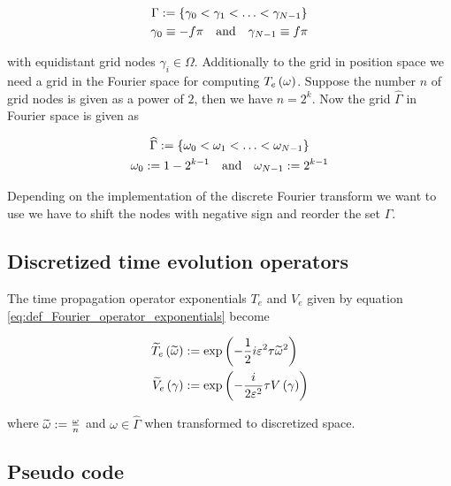 \begin{gather} \label{eq:comp_domain_grid}
  \Gamma := \{ \gamma_0 < \gamma_1 < \ldots < \gamma_{N-1} \} \\
  \gamma_0 \equiv -f \pi \quad \text{and} \quad \gamma_{N-1} \equiv f \pi
\end{gather}

with equidistant grid nodes $\gamma_i \in \Omega$. Additionally to the grid in position space
we need a grid in the Fourier space for computing $T_e\left( \omega \right)$. Suppose the
number $n$ of grid nodes is given as a power of $2$, then we have $n = 2^{k}$. Now
the grid $\widehat{\Gamma}$ in Fourier space is given as

\begin{gather} \label{eq:comp_domain_grid_fourier}
  \widehat{\Gamma} := \{ \omega_0 < \omega_1 < \ldots < \omega_{N-1} \} \\
  \omega_0 := 1-2^{k-1} \quad \text{and} \quad \omega_{N-1} := 2^{k-1}
\end{gather}

Depending on the implementation of the discrete Fourier transform we want to use
we have to shift the nodes with negative sign and reorder the set $\widehat{\Gamma}$.

\subsection{Discretized time evolution operators}

The time propagation operator exponentials $T_e$ and $V_e$ given by equation \eqref{eq:def_Fourier_operator_exponentials}
become

\begin{equation}
\begin{split}
  \widetilde{T}_e\left( \widetilde{\omega} \right) & := \exp\left( -\frac{1}{2}i\varepsilon^2\tau\widetilde{\omega}^2 \right) \\
  \widetilde{V}_e\left( \gamma \right)             & := \exp\left( -\frac{i}{2\varepsilon^2}\tau V\left( \gamma \right) \right)
\end{split}
\end{equation}

where $\widetilde{\omega} := \frac{\omega}{n}$ and $\omega \in \widehat{\Gamma}$
when transformed to discretized space.

\subsection{Pseudo code}

